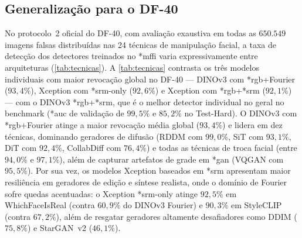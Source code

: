 \documentclass[10pt,conference]{IEEEtran}
\makeatletter
\newcommand{\acr@use}[2]{%
  \@ifundefined{acr@short@#1}{\textbf{??#1??}}{%
    \@ifundefined{acr@used@#1}{%
      \ifnum#2=0 \csname acr@long@#1\endcsname\else\csname acr@longpl@#1\endcsname\fi
      ~(\csname acr@short@#1\endcsname\ifnum#2=1 s\fi)%
      \expandafter\gdef\csname acr@used@#1\endcsname{}%
    }{%
      \csname acr@short@#1\endcsname\ifnum#2=1 s\fi
    }}%
}
\DeclareRobustCommand{\gls}{\@ifstar{\acr@use@s}{\acr@use@s}}
\newcommand{\acr@use@s}[1]{\acr@use{#1}{0}}
\DeclareRobustCommand{\glspl}{\@ifstar{\acr@use@p}{\acr@use@p}}
\newcommand{\acr@use@p}[1]{\acr@use{#1}{1}}
\makeatother
\begin{document}
\subsection{Generalização para o DF-40}
\label{sec:df40}

No protocolo~2 oficial do DF-40, com avaliação exaustiva em todas as $650.549$ imagens falsas distribuídas nas 24 técnicas de manipulação facial, a taxa de detecção dos detectores treinados no \gls*{mffi} varia expressivamente entre arquiteturas (\cref{tab:tecnicas}).
A \cref{tab:tecnicas} contrasta os três modelos individuais com maior revocação global no DF-40 --- DINOv3 com \gls*{rgb}+Fourier ($93{,}4\%$), Xception com \gls*{srm}-only ($92{,}6\%$) e Xception com \gls*{rgb}+\gls*{srm} ($92{,}1\%$) --- com o DINOv3 \gls*{rgb}+\gls*{srm}, que é o melhor detector individual no geral no benchmark (\gls*{auc} de validação de $99{,}5\%$ e $85{,}2\%$ no Test-Hard).
O DINOv3 com \gls*{rgb}+Fourier atinge a maior revocação média global ($93{,}4\%$) e lidera em dez técnicas, dominando geradores de difusão (RDDM com $99{,}0\%$, SiT com $93{,}1\%$, DiT com $92{,}4\%$, CollabDiff com $76{,}4\%$) e todas as técnicas de troca facial (entre $94{,}0\%$ e $97{,}1\%$), além de capturar artefatos de grade em \glspl*{gan} (VQGAN com $95{,}5\%$).
Por sua vez, os modelos Xception baseados em \gls*{srm} apresentam maior resiliência em geradores de edição e síntese realista, onde o domínio de Fourier sofre quedas acentuadas: o Xception \gls*{srm}-only atinge $92{,}5\%$ em WhichFaceIsReal (contra $60{,}9\%$ do DINOv3 Fourier) e $90{,}3\%$ em StyleCLIP (contra $67{,}2\%$), além de resgatar geradores altamente desafiadores como DDIM ($75{,}8\%$) e StarGAN~v2 ($46{,}1\%$).
\end{document}
